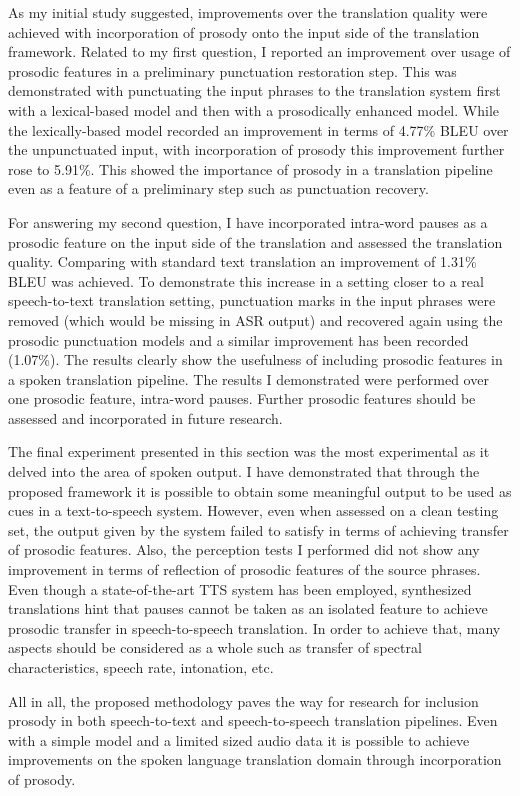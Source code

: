 As my initial study suggested, improvements over the translation quality were achieved with incorporation of prosody onto the input side of the translation framework. Related to my first question, I reported an improvement over usage of prosodic features in a preliminary punctuation restoration step. This was demonstrated with punctuating the input phrases to the translation system first with a lexical-based model and then with a prosodically enhanced model. While the lexically-based model recorded an improvement in terms of 4.77\% BLEU over the unpunctuated input, with incorporation of prosody this improvement further rose to 5.91\%. This showed the importance of prosody in a translation pipeline even as a feature of a preliminary step such as punctuation recovery. 

For answering my second question, I have incorporated intra-word pauses as a prosodic feature on the input side of the translation and assessed the translation quality. Comparing with standard text translation an improvement of 1.31\% BLEU was achieved. To demonstrate this increase in a setting closer to a real speech-to-text translation setting, punctuation marks in the input phrases were removed (which would be missing in ASR output) and recovered again using the prosodic punctuation models and a similar improvement has been recorded (1.07\%). The results clearly show the usefulness of including prosodic features in a spoken translation pipeline. The results I demonstrated were performed over one prosodic feature, intra-word pauses. Further prosodic features should be assessed and incorporated in future research. 

The final experiment presented in this section was the most experimental as it delved into the area of spoken output. I have demonstrated that through the proposed framework it is possible to obtain some meaningful output to be used as cues in a text-to-speech system. However, even when assessed on a clean testing set, the output given by the system failed to satisfy in terms of achieving transfer of prosodic features. Also, the perception tests I performed did not show any improvement in terms of reflection of prosodic features of the source phrases. Even though a state-of-the-art TTS system has been employed, synthesized translations hint that pauses cannot be taken as an isolated feature to achieve prosodic transfer in speech-to-speech translation. In order to achieve that, many aspects should be considered as a whole such as transfer of spectral characteristics, speech rate, intonation, etc. 

All in all, the proposed methodology paves the way for research for inclusion prosody in both speech-to-text and speech-to-speech translation pipelines. Even with a simple model and a limited sized audio data it is possible to achieve improvements on the spoken language translation domain through incorporation of prosody. 

